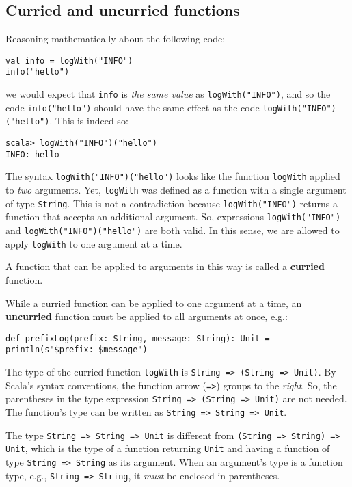 \subsection{Curried and uncurried functions}

Reasoning mathematically about the following code:
\begin{lstlisting}
val info = logWith("INFO")
info("hello")
\end{lstlisting}
we would expect that \lstinline!info! is \emph{the same value} as
\lstinline!logWith("INFO")!, and so the code \lstinline!info("hello")!
should have the same effect as the code \lstinline!logWith("INFO")("hello")!.
This is indeed so:
\begin{lstlisting}
scala> logWith("INFO")("hello")
INFO: hello
\end{lstlisting}
The syntax \lstinline!logWith("INFO")("hello")! looks like the function
\lstinline!logWith! applied to \emph{two} arguments. Yet, \lstinline!logWith!
was defined as a function with a single argument of type \lstinline!String!.
This is not a contradiction because \lstinline!logWith("INFO")! returns
a function that accepts an additional argument. So, expressions \lstinline!logWith("INFO")!
and \lstinline!logWith("INFO")("hello")! are both valid. In this
sense, we are allowed to apply \lstinline!logWith! to one argument
at a time.

A function that can be applied to arguments in this way is called
a \textbf{curried} function. 

While a curried function can be applied to one argument at a time,
an \textbf{uncurried} function must be
applied to all arguments at once, e.g.:
\begin{lstlisting}
def prefixLog(prefix: String, message: String): Unit = println(s"$prefix: $message")
\end{lstlisting}

The type of the curried function \lstinline!logWith! is \lstinline!String => (String => Unit)!.
By Scala\textsf{'}s syntax conventions, the function arrow (\lstinline!=>!)
groups to the \emph{right}. So, the parentheses in the type expression
\lstinline!String => (String => Unit)! are not needed. The function\textsf{'}s
type can be written as \lstinline!String => String => Unit!.

The type \lstinline!String => String => Unit! is different from \lstinline!(String => String) => Unit!,
which is the type of a function returning \lstinline!Unit! and having
a function of type \lstinline!String => String! as its argument.
When an argument\textsf{'}s type is a function type, e.g., \lstinline!String => String!,
it \emph{must} be enclosed in parentheses.

